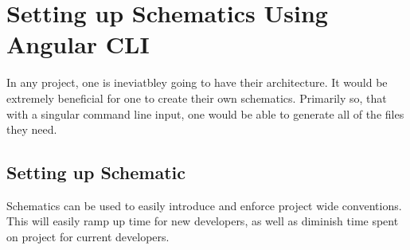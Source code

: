 \maketitle{}
\section{ Setting up Schematics Using Angular CLI }

In any project, one is ineviatbley going to have their architecture. It would
be extremely beneficial for one to create their own schematics. Primarily so,
that with a singular command line input, one would be able to generate all of
the files they need.

\subsection{ Setting up Schematic }

Schematics can be used to easily introduce and enforce project wide conventions.
This will easily ramp up time for new developers, as well as diminish time
spent on project for current developers.
